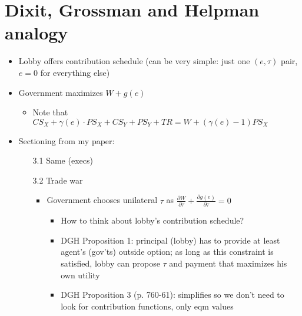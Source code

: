 \documentclass[12pt]{article}
\newcommand{\ga}{\gamma}
\begin{document}
\section{Dixit, Grossman and Helpman analogy}
\begin{itemize}
	\item Lobby offers contribution schedule (can be very simple: just one $(e,\tau)$ pair, $e=0$ for everything else)
	\item Government maximizes $W + g(e)$
		\begin{itemize}
			\item Note that $CS_X + \ga(e) \cdot PS_X + CS_Y + PS_Y +TR = W + \left( \ga(e) - 1 \right) PS_X$
		\end{itemize}
	\item Sectioning from my paper:
		\begin{itemize}
			\item[3.1] Same (execs)
			\item[3.2] Trade war
				\begin{itemize}
					\item Government chooses unilateral $\tau$ as $\frac{\partial W}{\partial \tau} + \frac{\partial g(e)}{\partial \tau} = 0$
						\begin{itemize}
							\item How to think about lobby's contribution schedule?
							\item DGH Proposition 1: principal (lobby) has to provide at least agent's (gov'ts) outside option; as long as this constraint is satisfied, lobby can propose $\tau$ and payment that maximizes his own utility
							\item DGH Proposition 3 (p. 760-61): simplifies so we don't need to look for contribution functions, only eqm values
						\end{itemize}
				\end{itemize}
		\end{itemize}
\end{itemize}
\end{document}
